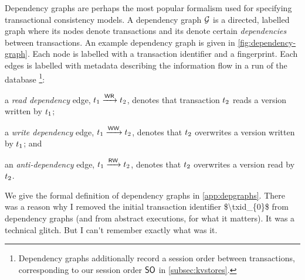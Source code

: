 Dependency graphs \cite{adya-icde,adya} are perhaps the most popular 
formalism used for specifying transactional consistency models. 
A dependency graph $\mathcal{G}$ is a directed, labelled graph where its
nodes denote transactions and its denote certain \emph{dependencies} between transactions.  
An example dependency graph is given in \cref{fig:dependency-graph}.
Each node is labelled with a transaction identifier and a fingerprint.
Each edges is labelled with metadata describing the information flow in a run of the database%
\footnote{Dependency graphs additionally record a session order between transactions, corresponding to our session order $\mathsf{SO}$ in \cref{subsec:kvstores}.}:
\begin{enumerate*}
	\item a \emph{read dependency} edge, $t_1 \xrightarrow{\mathsf{WR}} t_2$, denotes
that transaction $t_2$ reads a version written by $t_1$;
	\item a \emph{write dependency} edge, $t_1 \xrightarrow{\mathsf{WW}} t_2$, denotes that $t_2$ overwrites a version written by $t_1$; and 
	\item an \emph{anti-dependency} edge, $t_1 \xrightarrow{\mathsf{RW}} t_2$, denotes that $t_2$ overwrites a version read by $t_2$. 
\end{enumerate*}
We give the formal definition of dependency graphs in \cref{app:depgraphs}.
%
\ac{There was a reason why I removed the initial transaction identifier $\txid_{0}$ 
from dependency graphs (and from abstract executions, for what it matters). It was 
a technical glitch. But I can't remember exactly what was it.}
